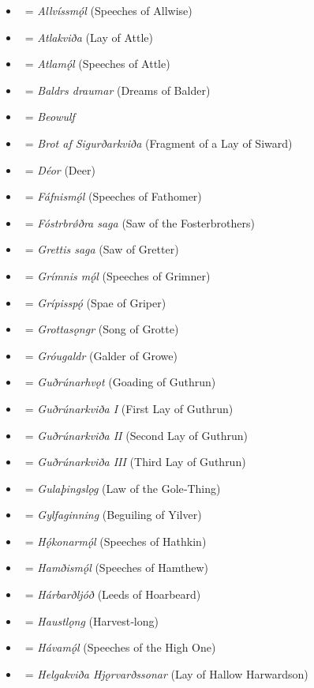 \begin{itemize}%
	\item \Allvismal\ = \emph{Allvíssmǫ́l} (Speeches of Allwise)
	\item \Atlakvida\ = \emph{Atlakviða} (Lay of Attle)
	\item \Atlamal\ = \emph{Atlamǫ́l} (Speeches of Attle)
	\item \Baldrsdraumar\ = \emph{Baldrs draumar} (Dreams of Balder)
	\item \Beowulf\ = \emph{Beowulf}
	\item \Brot\ = \emph{Brot af Sigurðarkviða} (Fragment of a Lay of Siward)
	\item \Deor\ = \emph{Déor} (Deer)
	\item \Fafnismal\ = \emph{Fáfnismǫ́l} (Speeches of Fathomer)
	\item \FostrbroedhraSaga\ = \emph{Fóstrbrǿðra saga} (Saw of the Fosterbrothers)
	\item \Grettissaga\ = \emph{Grettis saga} (Saw of Gretter)
	\item \Grimnismal\ = \emph{Grímnis mǫ́l} (Speeches of Grimner)
	\item \Gripisspa\ = \emph{Grípisspǫ́} (Spae of Griper)
	\item \Grottasongr\ = \emph{Grottasǫngr} (Song of Grotte)
	\item \Grougaldr\ = \emph{Gróugaldr} (Galder of Growe)
	\item \Gudrunarhvot\ = \emph{Guðrúnarhvǫt} (Goading of Guthrun)
	\item \GudrunOne\ = \emph{Guðrúnarkviða I} (First Lay of Guthrun)
	\item \GudrunTwo\ = \emph{Guðrúnarkviða II} (Second Lay of Guthrun)
	\item \GudrunThree\ = \emph{Guðrúnarkviða III} (Third Lay of Guthrun)
	\item \Gulatingslog\ = \emph{Gulaþingslǫg} (Law of the Gole‑Thing)
	\item \Gylfaginning\ = \emph{Gylfaginning} (Beguiling of Yilver)
	\item \Hakonarmal\ = \emph{Hǫ́konarmǫ́l} (Speeches of Hathkin)
	\item \Hamdismal\ = \emph{Hamðismǫ́l} (Speeches of Hamthew)
	\item \Harbardsljod\ = \emph{Hárbarðljóð} (Leeds of Hoarbeard)
	\item \Haustlong\ = \emph{Haustlǫng} (Harvest‑long)
	\item \Havamal\ = \emph{Hávamǫ́l} (Speeches of the High One)
	\item \HelgakvidaHjorvardssonar\ = \emph{Helgakviða Hjǫrvarðssonar} (Lay of Hallow Harwardson)

\end{itemize}
